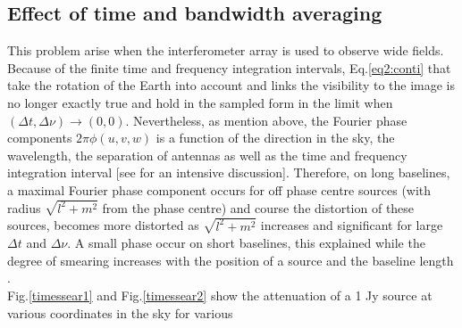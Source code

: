 \documentclass[useAMS,usenatbib]{mn2e}
\begin{document}
\subsection{Effect of time and bandwidth averaging}
\label{sec:effectbw}
This problem arise when the interferometer array is used to observe wide fields. Because of the finite time and frequency 
integration intervals, Eq.\ref{eq2:conti} that take the rotation of the Earth into account and links
the visibility to the image is no 
longer exactly true and hold in the sampled form in the limit when $(\Delta t, \Delta \nu) \rightarrow (0,0)$. Nevertheless, as mention 
above, the Fourier phase components $2\pi \phi(u,v,w)$ is a function of the direction in the sky, the wavelength, the separation of 
antennas as well as the time and frequency integration interval [see \citep{bregman2012system} for an intensive discussion]. Therefore, on 
long baselines, a maximal Fourier phase component occurs for off phase centre  sources (with radius $\sqrt{l^2 + m^2}$ from the phase 
centre) and course the distortion of these sources,  becomes more distorted as  $\sqrt{l^2 + m^2}$ increases and significant for large 
$\Delta t$ and  $\Delta \nu$. A small phase occur on short baselines, this explained while the degree of smearing 
increases with the position of a source and the baseline length \citep{bregman2012system}.\\
Fig.\ref{timessear1} and Fig.\ref{timessear2} show the attenuation of a 1 Jy source at various coordinates in the sky for various 
\end{document}
